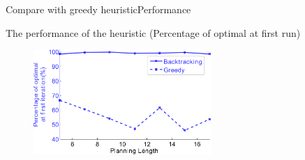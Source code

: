 \begin{frame}{Compare with greedy heuristic}{Performance}

The performance of the heuristic (Percentage of optimal at first run)

\bigskip
\bigskip


\begin{figure}
\centering
\includegraphics[width=0.6\textwidth]{./figure/compareGreedy}
\end{figure}

\end{frame}

